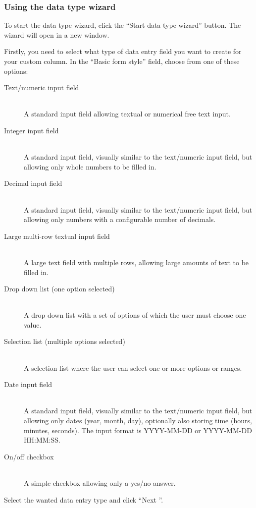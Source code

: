 \documentclass[a4paper,oneside,openany,12pt]{memoir}
\begin{document}
\subsubsection{Using the data type wizard}
To start the data type wizard, click the ``Start data type wizard'' button.
The wizard will open in a new window.

Firstly, you need to select what type of data entry field you want to create for your custom column.
In the ``Basic form style'' field, choose from one of these options:
\begin{description}
  \item[Text/numeric input field] \hfill \\
  A standard input field allowing textual or numerical free text input.
  \item[Integer input field] \hfill \\
  A standard input field, visually similar to the text/numeric input field, but allowing only whole numbers to be filled in.
  \item[Decimal input field] \hfill \\
  A standard input field, visually similar to the text/numeric input field, but allowing only numbers with a configurable number of decimals.
  \item[Large multi-row textual input field] \hfill \\
  A large text field with multiple rows, allowing large amounts of text to be filled in.
  \item[Drop down list (one option selected)] \hfill \\
  A drop down list with a set of options of which the user must choose one value.
  \item[Selection list (multiple options selected)] \hfill \\
  A selection list where the user can select one or more options or ranges.
  \item[Date input field] \hfill \\
  A standard input field, visually similar to the text/numeric input field, but allowing only dates (year, month, day), optionally also storing time (hours, minutes, seconds).
  The input format is YYYY-MM-DD or YYYY-MM-DD HH:MM:SS.
  \item[On/off checkbox] \hfill \\
  A simple checkbox allowing only a yes/no answer.
\end{description}

\noindent
Select the wanted data entry type and click ``Next \guillemotright''.
\end{document}
